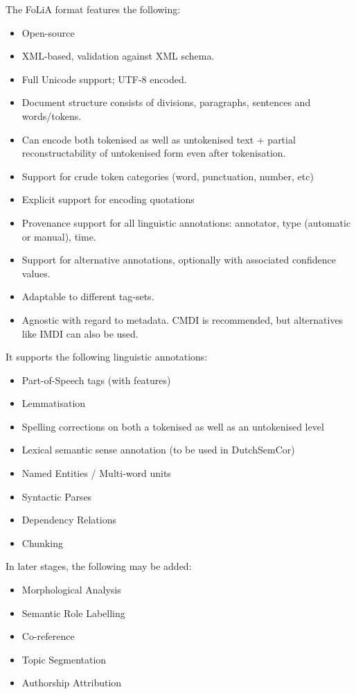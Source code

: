 \documentclass[a4paper,12pt]{report}
\begin{document}
The FoLiA format features the following:

\begin{itemize}
\item Open-source
\item XML-based, validation against XML schema.
\item Full Unicode support; UTF-8 encoded.
\item Document structure consists of divisions, paragraphs, sentences and words/tokens.
\item Can encode both tokenised as well as untokenised text + partial reconstructability of untokenised form even after tokenisation.
\item Support for crude token categories (word, punctuation, number, etc)
\item Explicit support for encoding quotations
\item Provenance support for all linguistic annotations: annotator, type (automatic or manual), time.
\item Support for alternative annotations, optionally with associated confidence values.
\item Adaptable to different tag-sets.
\item Agnostic with regard to metadata. CMDI is recommended, but alternatives like IMDI can also be used.
\end{itemize}

It supports the following linguistic annotations:

\begin{itemize}
\item Part-of-Speech tags (with features)
\item Lemmatisation
\item Spelling corrections on both a tokenised as well as an untokenised level
\item Lexical semantic sense annotation (to be used in DutchSemCor)
\item Named Entities / Multi-word units
\item Syntactic Parses
\item Dependency Relations
\item Chunking
\end{itemize}

In later stages, the following may be added:

\begin{itemize}
\item Morphological Analysis
\item Semantic Role Labelling
\item Co-reference
\item Topic Segmentation
\item Authorship Attribution
\end{itemize}
\end{document}
